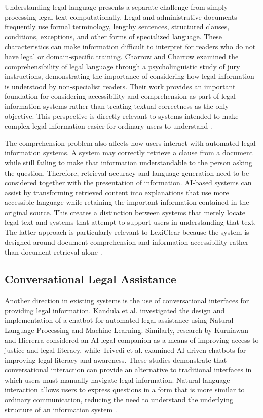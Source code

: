 \documentclass[12pt,a4paper,oneside]{report}
\begin{document}
Understanding legal language presents a separate challenge from simply
processing legal text computationally. Legal and administrative documents
frequently use formal terminology, lengthy sentences, structured clauses,
conditions, exceptions, and other forms of specialized language. These
characteristics can make information difficult to interpret for readers who
do not have legal or domain-specific training. Charrow and Charrow examined
the comprehensibility of legal language through a psycholinguistic study of
jury instructions, demonstrating the importance of considering how legal
information is understood by non-specialist readers. Their work provides an
important foundation for considering accessibility and comprehension as part
of legal information systems rather than treating textual correctness as the
only objective. This perspective is directly relevant to systems intended to
make complex legal information easier for ordinary users to understand
\cite{charrow1979}.

The comprehension problem also affects how users interact with automated
legal-information systems. A system may correctly retrieve a clause from a
document while still failing to make that information understandable to the
person asking the question. Therefore, retrieval accuracy and language
generation need to be considered together with the presentation of information.
AI-based systems can assist by transforming retrieved content into explanations
that use more accessible language while retaining the important information
contained in the original source. This creates a distinction between systems
that merely locate legal text and systems that attempt to support users in
understanding that text. The latter approach is particularly relevant to
LexiClear because the system is designed around document comprehension and
information accessibility rather than document retrieval alone
\cite{charrow1979,basha2024}.

\subsection{Conversational Legal Assistance}

Another direction in existing systems is the use of conversational interfaces
for providing legal information. Kandula et al. investigated the design and
implementation of a chatbot for automated legal assistance using Natural
Language Processing and Machine Learning. Similarly, research by Kurniawan
and Hiererra considered an AI legal companion as a means of improving access
to justice and legal literacy, while Trivedi et al. examined AI-driven
chatbots for improving legal literacy and awareness. These studies demonstrate
that conversational interaction can provide an alternative to traditional
interfaces in which users must manually navigate legal information. Natural
language interaction allows users to express questions in a form that is more
similar to ordinary communication, reducing the need to understand the
underlying structure of an information system
\cite{kandula2023,kurniawan2024,trivedi2024}.
\end{document}
